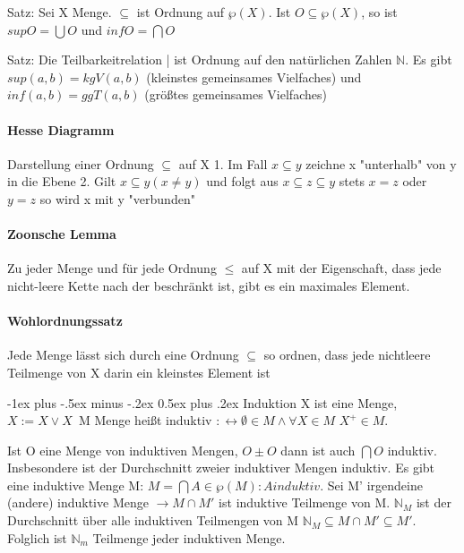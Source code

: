 \documentclass[a4paper]{article}
\makeatletter
\renewcommand{\section}{\@startsection{section}{1}{0mm}%
                                {-1ex plus -.5ex minus -.2ex}%
                                {0.5ex plus .2ex}%
                                {\normalfont\large\bfseries}}
\makeatother
\begin{document}
\begin{multicols}{3}
    Satz: Sei X Menge. $\subseteq$ ist Ordnung auf $\wp(X)$. Ist $O\subseteq \wp(X)$, so ist $sup O=\bigcup O$ und $inf O=\bigcap O$
    
    Satz: Die Teilbarkeitrelation | ist Ordnung auf den natürlichen Zahlen $\mathbb{N}$. Es gibt $sup(a,b)=kgV(a,b)$ (kleinstes gemeinsames Vielfaches) und $inf(a,b)=ggT(a,b)$ (größtes gemeinsames Vielfaches)
    
    \paragraph{Hesse Diagramm}
    Darstellung einer Ordnung $\subseteq$ auf X
    1. Im Fall $x\subseteq y$ zeichne x "unterhalb" von y in die Ebene
    2. Gilt $x\subseteq y (x\not = y)$ und folgt aus $x \subseteq z \subseteq y$ stets $x=z$ oder $y=z$ so wird x mit y "verbunden"
    
    \paragraph{Zoonsche Lemma}
    Zu jeder Menge und für jede Ordnung $\leq$ auf X mit der Eigenschaft, dass jede nicht-leere Kette nach der beschränkt ist, gibt es ein maximales Element.
    
    \paragraph{Wohlordnungssatz}
    Jede Menge lässt sich durch eine Ordnung $\subseteq$ so ordnen, dass jede nichtleere Teilmenge von X darin ein kleinstes Element ist
    
    \section{Induktion}
    X ist eine Menge, $X:=X\vee {X}$\
    M Menge heißt induktiv $:\leftrightarrow \emptyset \in M \wedge \forall X \in M$  $X^+ \in M$.
    
    Ist O eine Menge von induktiven Mengen, $O\pm O$ dann ist auch $\bigcap O$ induktiv. Insbesondere ist der Durchschnitt zweier induktiver Mengen induktiv. Es gibt eine induktive Menge M: $M =\bigcap {A \in \wp(M): A induktiv}$.
    Sei M' irgendeine (andere) induktive Menge $\rightarrow M \cap M'$ ist induktive Teilmenge von M. $\mathbb{N}_M$ ist der Durchschnitt über alle induktiven Teilmengen von M $\mathbb{N}_M \subseteq M \cap M' \subseteq M'$. Folglich ist $\mathbb{N}_m$ Teilmenge jeder induktiven Menge.
    

\end{multicols}
\end{document}
